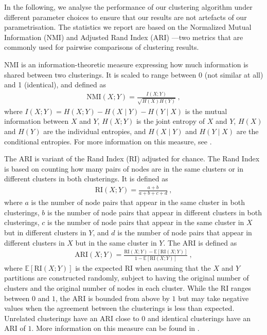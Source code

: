 In the following, we analyse the performance of our clustering algorithm under different parameter choices to ensure that our results are not artefacts of our parametrisation. 
The statistics we report are based on the Normalized Mutual Information (NMI) and Adjusted Rand Index (ARI)%
---two metrics that are commonly used for pairwise comparisons of clustering results.

NMI is an information-theoretic measure expressing how much information is shared between two clusterings.
It is scaled to range between $0$ (not similar at all) and 1 (identical), and defined as
\begin{align*}
\text{NMI}(X;Y) = \frac{I(X;Y)}{\sqrt{H(X)H(Y)}}~,
\end{align*}
where $I(X;Y) = H(X;Y)-H(X\mid Y)-H(Y\mid X)$ is the mutual information between $X$ and $Y$, $H(X;Y)$ is the joint entropy of $X$ and $Y$, 
$H(X)$ and $H(Y)$ are the individual entropies, 
and $H(X\mid Y)$ and $H(Y\mid X)$ are the conditional entropies.
For more information on this measure, see \cite{strehl2002}.

The ARI is variant of the Rand Index (RI) adjusted for chance. 
The Rand Index is based on counting how many pairs of nodes are in the same clusters or in different clusters in both clusterings. 
It is defined as
\begin{align*}
\text{RI}(X;Y) = \frac{a+b}{a+b+c+d}~,
\end{align*}
where $a$ is the number of node pairs that appear in the same cluster in both clusterings, 
$b$ is the number of node pairs that appear in different clusters in both clusterings, 
$c$ is the number of node pairs that appear in the same cluster in $X$ but in different clusters in $Y$, and
$d$ is the number of node pairs that appear in different clusters in $X$ but in the same cluster in $Y$. 
The ARI is defined as
\begin{align*}
\text{ARI}(X;Y) = \frac{\text{RI}(X;Y) - \mathbb{E}[\text{RI}(X;Y)]}{1 - \mathbb{E}[\text{RI}(X;Y)]}~,
\end{align*}
where $\mathbb{E}[\text{RI}(X;Y)]$ is the expected RI when assuming that the $X$ and $Y$ partitions are constructed randomly, 
subject to having the original number of clusters and the original number of nodes in each cluster.
While the RI ranges between $0$ and $1$, the ARI is bounded from above by $1$ but may take negative values when the agreement between the clusterings is less than expected. 
Unrelated clusterings have an ARI close to $0$ and identical clusterings have an ARI of $1$. 
More information on this measure can be found in \cite{hubert1985}.


